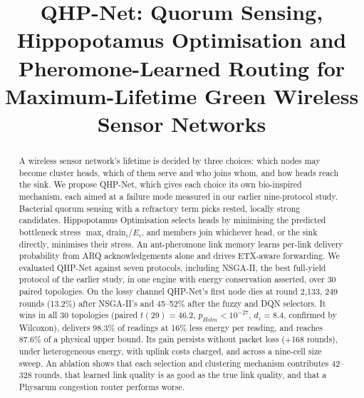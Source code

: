 \documentclass[conference]{IEEEtran}
\newcommand{\fndfrac}{87.6}
\begin{document}
\title{QHP-Net: Quorum Sensing, Hippopotamus Optimisation and Pheromone-Learned Routing for Maximum-Lifetime Green Wireless Sensor Networks}

\author{
}

\maketitle

\begin{abstract}
A wireless sensor network's lifetime is decided by three choices: which nodes may become cluster heads, which of them serve and who joins whom, and how heads reach the sink. We propose QHP-Net, which gives each choice its own bio-inspired mechanism, each aimed at a failure mode measured in our earlier nine-protocol study. Bacterial quorum sensing with a refractory term picks rested, locally strong candidates. Hippopotamus Optimisation selects heads by minimising the predicted bottleneck stress $\max_i \text{drain}_i/E_i$, and members join whichever head, or the sink directly, minimises their stress. An ant-pheromone link memory learns per-link delivery probability from ARQ acknowledgements alone and drives ETX-aware forwarding. We evaluated QHP-Net against seven protocols, including NSGA-II, the best full-yield protocol of the earlier study, in one engine with energy conservation asserted, over 30 paired topologies. On the lossy channel QHP-Net's first node dies at round 2,133, 249 rounds (13.2\%) after NSGA-II's and 45--52\% after the fuzzy and DQN selectors. It wins in all 30 topologies (paired $t(29)=46.2$, $p_{Holm}<10^{-27}$, $d_z=8.4$, confirmed by Wilcoxon), delivers 98.3\% of readings at 16\% less energy per reading, and reaches \fndfrac\% of a physical upper bound. Its gain persists without packet loss (+168 rounds), under heterogeneous energy, with uplink costs charged, and across a nine-cell size sweep. An ablation shows that each selection and clustering mechanism contributes 42--328 rounds, that learned link quality is as good as the true link quality, and that a Physarum congestion router performs worse.
\end{abstract}
\end{document}
